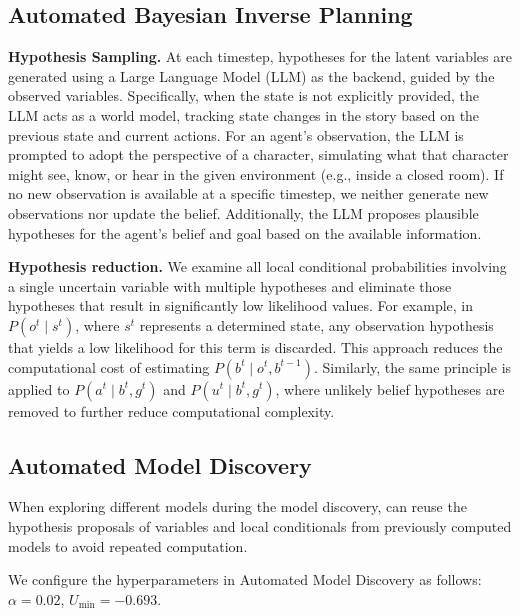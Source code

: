 \subsection{Automated Bayesian Inverse Planning}

\textbf{Hypothesis Sampling.} At each timestep, hypotheses for the latent variables are generated using a Large Language Model (LLM) as the backend, guided by the observed variables. Specifically, when the state is not explicitly provided, the LLM acts as a world model, tracking state changes in the story based on the previous state and current actions. For an agent's observation, the LLM is prompted to adopt the perspective of a character, simulating what that character might see, know, or hear in the given environment (e.g., inside a closed room). If no new observation is available at a specific timestep, we neither generate new observations nor update the belief. Additionally, the LLM proposes plausible hypotheses for the agent's belief and goal based on the available information.

\textbf{Hypothesis reduction.} We examine all local conditional probabilities involving a single uncertain variable with multiple hypotheses and eliminate those hypotheses that result in significantly low likelihood values. For example, in $P(o^t \mid s^t)$, where $s^t$ represents a determined state, any observation hypothesis that yields a low likelihood for this term is discarded. This approach reduces the computational cost of estimating $P(b^t \mid o^t, b^{t-1})$. Similarly, the same principle is applied to $P(a^t \mid b^t, g^t)$ and $P(u^t \mid b^t, g^t)$, where unlikely belief hypotheses are removed to further reduce computational complexity.


\subsection{Automated Model Discovery}
When exploring different models during the model discovery, \ours can reuse the hypothesis proposals of variables and local conditionals from previously computed models to avoid repeated computation.

We configure the hyperparameters in Automated Model Discovery as follows: $\alpha = 0.02$, $U_\text{min} = -0.693$.



